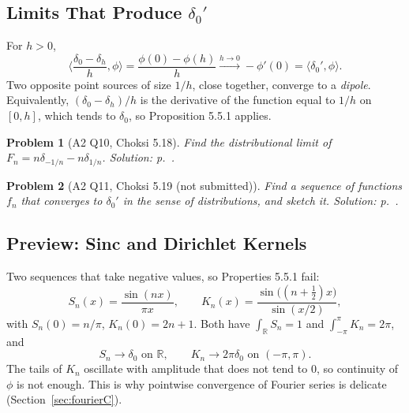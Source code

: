 \documentclass{article}
\newtheorem{problem}{Problem}
\newcommand{\R}{\mathbb{R}}
\newcommand{\ip}[2]{\langle #1, #2 \rangle}
\begin{document}
\subsection{Limits That Produce $\delta_0'$}
For $h > 0$,
\begin{equation}
    \ip{\frac{\delta_0 - \delta_h}{h}}{\phi} = \frac{\phi(0) - \phi(h)}{h} \xrightarrow{h \to 0} -\phi'(0) = \ip{\delta_0'}{\phi}.
\end{equation}
Two opposite point sources of size $1/h$, close together, converge to a \emph{dipole}. Equivalently, $(\delta_0 - \delta_h)/h$ is the derivative of the function equal to $1/h$ on $[0,h]$, which tends to $\delta_0$, so Proposition 5.5.1 applies.

\begin{problem}[A2 Q10, Choksi 5.18]\label{prob:a2-518}
    Find the distributional limit of $F_n = n\delta_{-1/n} - n\delta_{1/n}$.
    \hfill \emph{Solution: p.~\pageref{sol:a2-518}.}
\end{problem}
\begin{problem}[A2 Q11, Choksi 5.19 (not submitted)]\label{prob:a2-519}
    Find a sequence of functions $f_n$ that converges to $\delta_0'$ in the sense of distributions, and sketch it.
    \hfill \emph{Solution: p.~\pageref{sol:a2-519}.}
\end{problem}

\subsection{Preview: Sinc and Dirichlet Kernels}
Two sequences that take negative values, so Properties 5.5.1 fail:
\begin{equation}
    S_n(x) = \frac{\sin(nx)}{\pi x}, \qquad K_n(x) = \frac{\sin\big((n+\tfrac12)x\big)}{\sin(x/2)},
\end{equation}
with $S_n(0) = n/\pi$, $K_n(0) = 2n+1$. Both have $\int_\R S_n = 1$ and $\int_{-\pi}^\pi K_n = 2\pi$, and
\begin{equation}
    S_n \to \delta_0 \text{ on } \R, \qquad K_n \to 2\pi\delta_0 \text{ on } (-\pi,\pi).
\end{equation}
The tails of $K_n$ oscillate with amplitude that does not tend to $0$, so continuity of $\phi$ is not enough. This is why pointwise convergence of Fourier series is delicate (Section~\ref{sec:fourierC}).
\end{document}
